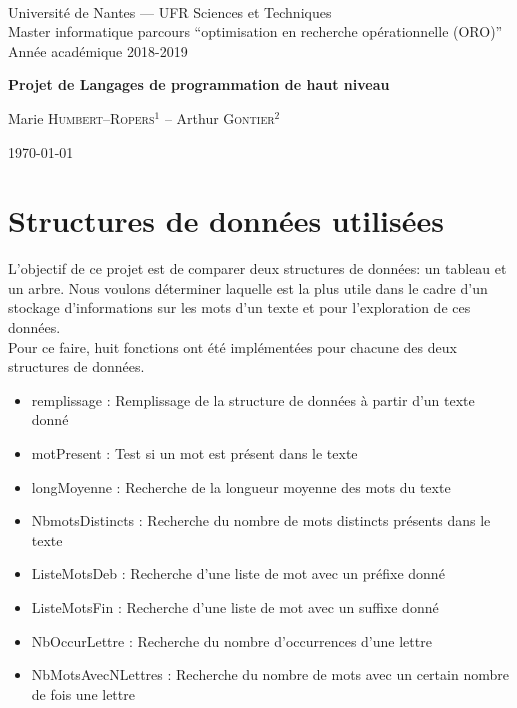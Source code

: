 \documentclass[a4paper,12pt]{article}
\begin{document}


~
\vspace{50mm}
{\large
\begin{center}
  Université de Nantes --- UFR Sciences et Techniques\\
  Master informatique parcours ``optimisation en recherche opérationnelle (ORO)''\\
  Année académique 2018-2019
  \vspace{30mm}
 
  { \LARGE
 
     \vspace{5mm}
 
     {\huge \textbf{Projet de Langages de programmation de haut niveau}}
     \vspace{5mm}
 
     Marie \textsc{Humbert--Ropers}$^1$ --  Arthur \textsc{Gontier}$^2$
     \vspace{50mm}
  
     \today
  }  
\end{center}
}

\vfill
\break

\tableofcontents

\vfill
\break

\section{Structures de données utilisées}
L'objectif de ce projet est de comparer deux structures de données: un tableau et un arbre. Nous voulons déterminer laquelle est la plus utile dans le cadre d'un stockage d'informations sur les mots d'un texte et pour l'exploration de ces données. \\
Pour ce faire, huit fonctions ont été implémentées pour chacune des deux structures de données.
\begin{itemize}
\item remplissage : Remplissage de la structure de données à partir d'un texte donné
\item motPresent : Test si un mot est présent dans le texte
\item longMoyenne : Recherche de la longueur moyenne des mots du texte
\item NbmotsDistincts : Recherche du nombre de mots distincts présents dans le texte
\item ListeMotsDeb : Recherche d'une liste de mot avec un préfixe donné
\item ListeMotsFin : Recherche d'une liste de mot avec un suffixe donné
\item NbOccurLettre : Recherche du nombre d'occurrences d'une lettre
\item NbMotsAvecNLettres : Recherche du nombre de mots avec un certain nombre de fois une lettre
\end{itemize}
\end{document}
